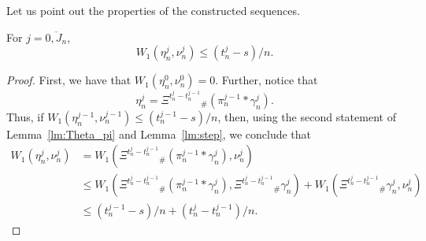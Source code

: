 \documentclass[a4paper,12pt]{article}
\begin{document}
Let us point out the properties of the constructed sequences.
\begin{lemma}\label{lm:nu_j_mu_j} For $j=\overline{0,J_n}$,
	$$W_1(\eta^j_n,\nu^j_n)\leq (t^j_n-s)/n.$$
\end{lemma}
\begin{proof}
	First, we have that $W_1(\eta^0_n,\nu^0_n)=0$. Further, notice that $$\eta^j_n=\Xi^{t^j_n-t^{j-1}_n}{}_\#(\pi^{j-1}_n*\gamma^j_n).$$ Thus, if $W_1(\eta^{j-1}_n,\nu^{j-1}_n)\leq (t^{j-1}_n-s)/n$, then, using the second statement  of Lemma~\ref{lm:Theta_pi} and Lemma~\ref{lm:step}, we conclude that
	\begin{equation*}\begin{split}W_1(\eta^j_n,\nu^j_n)&= W_1(\Xi^{t^j_n-t^{j-1}_n}{}_\#(\pi^{j-1}_n*\gamma^j_n),\nu^j_n)\\ 
	&\leq 	W_1(\Xi^{t^j_n-t^{j-1}_n}{}_\#(\pi^{j-1}_n*\gamma^j_n),\Xi^{t^j_n-t^{j-1}_n}{}_\#\gamma^j_n)+ 
	W_1(\Xi^{t^j_n-t^{j-1}_n}{}_\#\gamma^j_n,\nu^j_n)\\&\leq
	(t^{j-1}_n-s)/n+(t^j_n-t^{j-1}_n)/n. \end{split}\end{equation*}
	
\end{proof}
\end{document}
